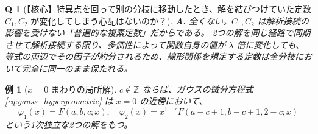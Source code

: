 \documentclass[paper=a4, fontsize=11pt]{jlreq} %
\theoremstyle{break}
\newtheorem{example}[theorem]{例}
\theoremstyle{qa}
\newtheorem*{Q}{Q}
\theoremstyle{remark} %
\begin{document}
\begin{Q}[【核心】特異点を回って別の分枝に移動したとき、解を結びつけていた定数 $C_1, C_2$ が変化してしまう心配はないのか？]
\textbf{A.} 全くない。$C_1, C_2$ は解析接続の影響を受けない「普遍的な複素定数」だからである。
2つの解を同じ経路で同期させて解析接続する限り、多価性によって関数自身の値が $\lambda$ 倍に変化しても、等式の両辺でその因子が約分されるため、線形関係を規定する定数は全分枝において完全に同一のまま保たれる。
\end{Q}
\begin{example}[$x=0$ まわりの局所解]\label{ex:gauss_solutions_zero}
    $c\notin\mathbb{Z}$ ならば、ガウスの微分方程式 \eqref{eq:gauss_hypergeometric} は $x=0$ の近傍において、
    \[
    \varphi_{1}(x)=F(a,b,c;x),\quad \varphi_{2}(x)=x^{1-c}F(a-c+1,b-c+1,2-c;x)
    \]
    という1次独立な2つの解をもつ。
\end{example}
\end{document}
